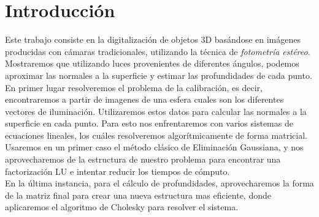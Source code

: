 \section{Introducción}


Este trabajo consiste en la digitalización de objetos 3D basándose en imágenes producidas con cámaras tradicionales, utilizando la técnica de \textit{fotometría estéreo}. Mostraremos que utilizando luces provenientes de diferentes ángulos, podemos aproximar las normales a la superficie y estimar las profundidades de cada punto. \\

En primer lugar resolveremos el problema de la calibración, es decir, encontraremos a partir de imagenes de una esfera cuales son los diferentes vectores de iluminación. Utilizaremos estos datos para calcular las normales a la superficie en cada punto. Para esto nos enfrentaremos con varios sistemas de ecuaciones lineales, los cuáles resolveremos algorítmicamente de forma matricial. Usaremos en un primer caso el método clásico de Eliminación Gaussiana, y nos aprovecharemos de la estructura de nuestro problema para encontrar una factorización LU e intentar reducir los tiempos de cómputo. \\

En la última instancia, para el cálculo de profundidades, aprovecharemos la forma de la matriz final para crear una nueva estructura mas eficiente, donde aplicaremos el algoritmo de Cholesky para resolver el sistema. \\

